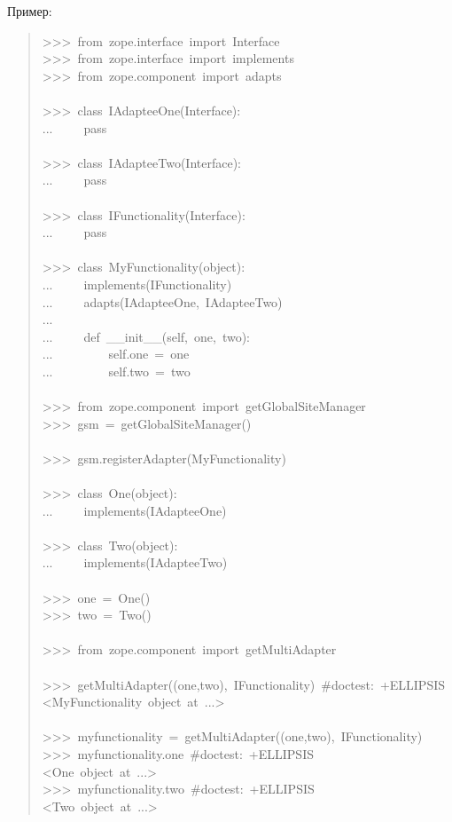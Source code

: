 \documentclass[a4paper,openany,twoside,final]{book}
\begin{document}
Пример:

\begin{quote}{\ttfamily \raggedright \noindent
>{}>{}>~from~zope.interface~import~Interface\\
>{}>{}>~from~zope.interface~import~implements\\
>{}>{}>~from~zope.component~import~adapts\\
~\\
>{}>{}>~class~IAdapteeOne(Interface):\\
...~~~~~pass\\
~\\
>{}>{}>~class~IAdapteeTwo(Interface):\\
...~~~~~pass\\
~\\
>{}>{}>~class~IFunctionality(Interface):\\
...~~~~~pass\\
~\\
>{}>{}>~class~MyFunctionality(object):\\
...~~~~~implements(IFunctionality)\\
...~~~~~adapts(IAdapteeOne,~IAdapteeTwo)\\
...\\
...~~~~~def~\_\_init\_\_(self,~one,~two):\\
...~~~~~~~~~self.one~=~one\\
...~~~~~~~~~self.two~=~two\\
~\\
>{}>{}>~from~zope.component~import~getGlobalSiteManager\\
>{}>{}>~gsm~=~getGlobalSiteManager()\\
~\\
>{}>{}>~gsm.registerAdapter(MyFunctionality)\\
~\\
>{}>{}>~class~One(object):\\
...~~~~~implements(IAdapteeOne)\\
~\\
>{}>{}>~class~Two(object):\\
...~~~~~implements(IAdapteeTwo)\\
~\\
>{}>{}>~one~=~One()\\
>{}>{}>~two~=~Two()\\
~\\
>{}>{}>~from~zope.component~import~getMultiAdapter\\
~\\
>{}>{}>~getMultiAdapter((one,two),~IFunctionality)~\#doctest:~+ELLIPSIS\\
<MyFunctionality~object~at~...>\\
~\\
>{}>{}>~myfunctionality~=~getMultiAdapter((one,two),~IFunctionality)\\
>{}>{}>~myfunctionality.one~\#doctest:~+ELLIPSIS\\
<One~object~at~...>\\
>{}>{}>~myfunctionality.two~\#doctest:~+ELLIPSIS\\
<Two~object~at~...>
}
\end{quote}
\end{document}
